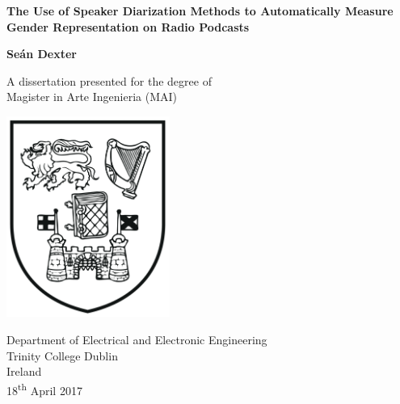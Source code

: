 \begin{titlepage}
    \begin{center}
        \vspace*{1cm}
        
        \Huge
        \textbf{The Use of Speaker Diarization Methods to Automatically Measure Gender Representation on Radio Podcasts}
        
        \vspace{0.5cm}
        \LARGE
        
        \vspace{1.5cm}
        
        \textbf{Se\'{a}n Dexter}
        
        \vfill
        
        A dissertation presented for the degree of\\
        Magister in Arte Ingenieria (MAI)
        
        \vspace{0.8cm}
        
        \includegraphics[width=0.4\textwidth]{TCDlogo.png}
        
        \Large
        Department of Electrical and Electronic Engineering\\
        Trinity College Dublin\\
        Ireland\\
        18\textsuperscript{th} April 2017
        
    \end{center}
\end{titlepage}
